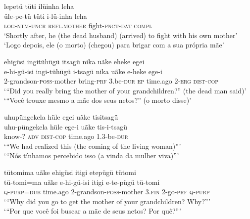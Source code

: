 \documentclass[output=paper,
modfonts,nonflat
]{langsci/langscibook}
\begin{document}
 
\ea lepetü tüti ilüinha leha \\[.3em]
\gll üle-pe-tü tüti i-lü-inha leha \\
\textsc{log-ntm-uncr} \textsc{refl.mother} fight-\textsc{pnct-dat} \textsc{compl} \\
\glt ‘Shortly after, he (the dead husband) (arrived) to fight with his own mother’  \\
‘Logo depois, ele (o morto) (chegou) para brigar com a sua própria mãe’ \\
\z

\ea ehigüsi ingitühügü itsagü nika uãke{\footnotemark}{}  eheke egei \\[.3em]
\gll e-hi-gü-isi ingi-tühügü i-tsagü nika uãke e-heke ege-i  \\
2-grandson-\textsc{poss}-mother bring-\textsc{prf} 3.be-\textsc{dur} \textsc{ep} time.ago 2\textsc{-erg} \textsc{dist-cop} \\
\glt ‘“Did you really bring the mother of your grandchildren?” (the dead man said)’ \\
‘“Você trouxe mesmo a mãe dos seus netos?” (o morto disse)’ \\
\z

\ea uhupüngekela{\footnotemark} hüle egei uãke tisitsagü \\[.3em]
\gll uhu-püngekela hüle ege-i uãke tis-i-tsagü \\
know-? \textsc{adv} \textsc{dist-cop} time.ago 1.3-be\textsc{-dur} \\
\glt ‘“We had realized this (the coming of the living woman)”’ \\
‘“Nós tínhamos percebido isso (a vinda da mulher viva)”’ \\
\z

\newpage 
\ea tütomima uãke ehigüsi itigi etepügü tütomi \\[.3em]
\gll tü-tomi=ma uãke e-hi-gü-isi itigi e-te-pügü tü-tomi \\
\textsc{q-purp=dub} time.ago 2-grandson\textsc{-poss-}mother 3\textsc{.fin} 2-go-\textsc{prf} \textsc{q-purp} \\
\glt ‘“Why did you go to get the mother of your grandchildren? Why?”’ \\
‘“Por que você foi buscar a mãe de seus netos? Por quê?”’ \\
\z
\end{document}
